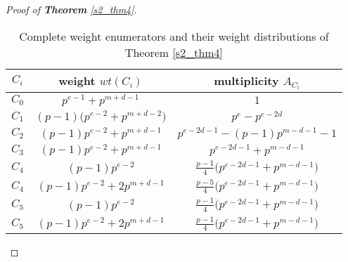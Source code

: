 \documentclass[final,1p,times]{elsarticle}
\begin{document}
\begin{proof}[Proof of \textbf{Theorem} \ref{s2_thm4}]
\begin{table}[tbh]
       \caption{Complete weight enumerators and their weight distributions of  Theorem \ref{s2_thm4}}
              \label{tab_sec3_proof_thm4}
              \begin{center}
              \begin{tabular}{|c|c|c|}
              \hline
               $ C_{i} $ & weight $ wt(C_{i}) $  & multiplicity $ A_{C_{i}} $ \\
               \hline
               $ C_{0} $ & $ p^{e-1}+p^{m+d-1} $ & $ 1 $\\
               \hline
               $ C_{1}  $ & $ (p-1) \bigl(p^{e-2}+p^{m+d-2}\bigr) $ & $ p^{e}-p^{e-2d} $\\
               \hline
                $ C_{2} $ & $ (p-1)p^{e-2}+p^{m+d-1} $ & $ p^{e-2d-1}-(p-1)p^{m-d-1}-1 $\\
              \hline
               $ C_{3} $ & $ (p-1)p^{e-2}+p^{m+d-1} $ & $ p^{e-2d-1}+p^{m-d-1} $\\
              \hline
               $ C_{4} $ & $ (p-1)p^{e-2} $ & $ \frac{p-1}{4}\bigl(p^{e-2d-1}+p^{m-d-1}\bigr) $\\
               \hline
               $ C_{4} $ & $ (p-1)p^{e-2}+2p^{m+d-1} $ & $ \frac{p-5}{4}\bigl(p^{e-2d-1}+p^{m-d-1}\bigr) $\\
               \hline
               $ C_{5} $ & $ (p-1)p^{e-2} $ & $\frac{p-1}{4}\bigl(p^{e-2d-1}+p^{m-d-1}\bigr)  $\\
               \hline
               $ C_{5} $ & $ (p-1)p^{e-2}+2p^{m+d-1} $ & $ \frac{p-1}{4}\bigl(p^{e-2d-1}+p^{m-d-1}\bigr) $\\
               \hline
              \end{tabular}
              \end{center}
        \end{table}
\end{proof}
\end{document}

